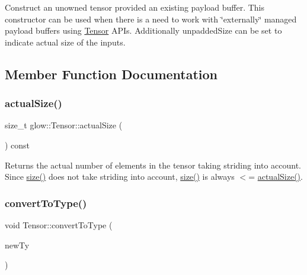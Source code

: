 Construct an unowned tensor provided an existing payload buffer. This constructor can be used when there is a need to work with \char`\"{}externally\char`\"{} managed payload buffers using \hyperlink{classglow_1_1_tensor}{Tensor} A\+P\+Is. Additionally {\ttfamily unpadded\+Size} can be set to indicate actual size of the inputs. 

\subsection{Member Function Documentation}
\mbox{\label{classglow_1_1_tensor_a72f7219f5e4e926d953fd1dc674ff7c0}} 
\subsubsection{\texorpdfstring{actual\+Size()}{actualSize()}}
{\footnotesize\ttfamily size\+\_\+t glow\+::\+Tensor\+::actual\+Size (\begin{DoxyParamCaption}{ }\end{DoxyParamCaption}) const\hspace{0.3cm}{\ttfamily [inline]}}

\begin{DoxyReturn}{Returns}
the actual number of elements in the tensor taking striding into account. Since \hyperlink{classglow_1_1_tensor_a131eef055527823adf306e8928d4ae04}{size()} does not take striding into account, \hyperlink{classglow_1_1_tensor_a131eef055527823adf306e8928d4ae04}{size()} is always $<$= \hyperlink{classglow_1_1_tensor_a72f7219f5e4e926d953fd1dc674ff7c0}{actual\+Size()}. 
\end{DoxyReturn}
\mbox{\label{classglow_1_1_tensor_a68745fea2e9158f33b0254db7e14be9a}} 
\subsubsection{\texorpdfstring{convert\+To\+Type()}{convertToType()}}
{\footnotesize\ttfamily void Tensor\+::convert\+To\+Type (\begin{DoxyParamCaption}\item[{\hyperlink{namespaceglow_ab92e14a94329daf4083db670e95fbcdf}{Elem\+Kind}}]{new\+Ty }\end{DoxyParamCaption})}

